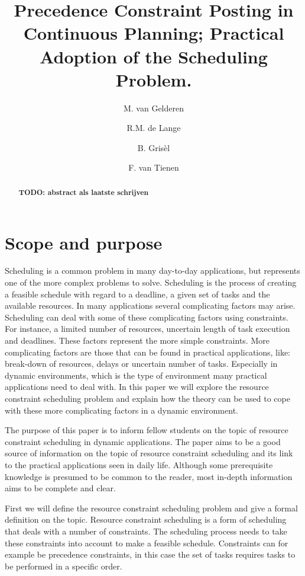 \documentclass{article}
\title{Precedence Constraint Posting in Continuous Planning; Practical Adoption of the Scheduling Problem.}
\author{M. van Gelderen  \and
    R.M. de Lange \and
    B. Gris\`el \and
    F. van Tienen}
\date{}
\newcommand{\TODO}[1]{{\color{red}\textbf{TODO: #1}}}
\begin{document}
\maketitle
\thispagestyle{empty}

\begin{abstract}
\TODO{abstract als laatste schrijven}
\end{abstract}

\newpage

\section{Scope and purpose}
Scheduling is a common problem in many day-to-day applications, but represents one of the more complex problems to solve.
Scheduling is the process of creating a feasible schedule with regard to a deadline, a given set of tasks and the available resources.
In many applications several complicating factors may arise.
Scheduling can deal with some of these complicating factors using constraints.
For instance, a limited number of resources, uncertain length of task execution and deadlines.
These factors represent the more simple constraints.
More complicating factors are those that can be found in practical applications, like: break-down of resources, delays or uncertain number of tasks.
Especially in dynamic environments, which is the type of environment many practical applications need to deal with.
In this paper we will explore the resource constraint scheduling problem and explain how the theory can be used to cope with these more complicating factors in a dynamic environment.

The purpose of this paper is to inform fellow students on the topic of resource constraint scheduling in dynamic applications.
The paper aims to be a good source of information on the topic of resource constraint scheduling and its link to the practical applications seen in daily life.
Although some prerequisite knowledge is presumed to be common to the reader, most in-depth information aims to be complete and clear.

First we will define the resource constraint scheduling problem and give a formal definition on the topic.
Resource constraint scheduling is a form of scheduling that deals with a number of constraints.
The scheduling process needs to take these constraints into account to make a feasible schedule.
Constraints can for example be precedence constraints, in this case the set of tasks requires tasks to be performed in a specific order.
\end{document}
